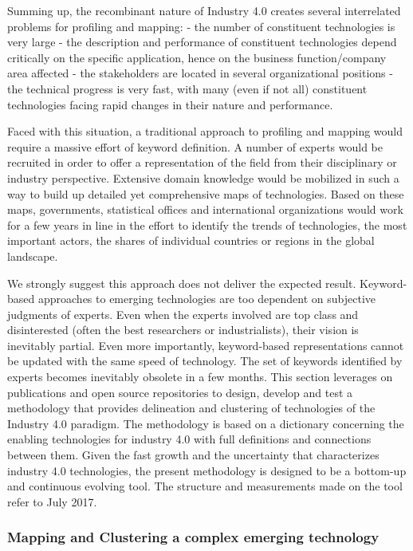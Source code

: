 \documentclass[b5paper,]{book}
\theoremstyle{definition}
\theoremstyle{definition}
\theoremstyle{definition}
\theoremstyle{remark}
\begin{document}
Summing up, the recombinant nature of Industry 4.0 creates several
interrelated problems for profiling and mapping: - the number of
constituent technologies is very large - the description and performance
of constituent technologies depend critically on the specific
application, hence on the business function/company area affected - the
stakeholders are located in several organizational positions - the
technical progress is very fast, with many (even if not all) constituent
technologies facing rapid changes in their nature and performance.

Faced with this situation, a traditional approach to profiling and
mapping would require a massive effort of keyword definition. A number
of experts would be recruited in order to offer a representation of the
field from their disciplinary or industry perspective. Extensive domain
knowledge would be mobilized in such a way to build up detailed yet
comprehensive maps of technologies. Based on these maps, governments,
statistical offices and international organizations would work for a few
years in line in the effort to identify the trends of technologies, the
most important actors, the shares of individual countries or regions in
the global landscape.

We strongly suggest this approach does not deliver the expected result.
Keyword-based approaches to emerging technologies are too dependent on
subjective judgments of experts. Even when the experts involved are top
class and disinterested (often the best researchers or industrialists),
their vision is inevitably partial. Even more importantly, keyword-based
representations cannot be updated with the same speed of technology. The
set of keywords identified by experts becomes inevitably obsolete in a
few months. This section leverages on publications and open source
repositories to design, develop and test a methodology that provides
delineation and clustering of technologies of the Industry 4.0 paradigm.
The methodology is based on a dictionary concerning the enabling
technologies for industry 4.0 with full definitions and connections
between them. Given the fast growth and the uncertainty that
characterizes industry 4.0 technologies, the present methodology is
designed to be a bottom-up and continuous evolving tool. The structure
and measurements made on the tool refer to July 2017.

\subsubsection*{Mapping and Clustering a complex emerging
technology}\label{mapping-and-clustering-a-complex-emerging-technology}
\end{document}
